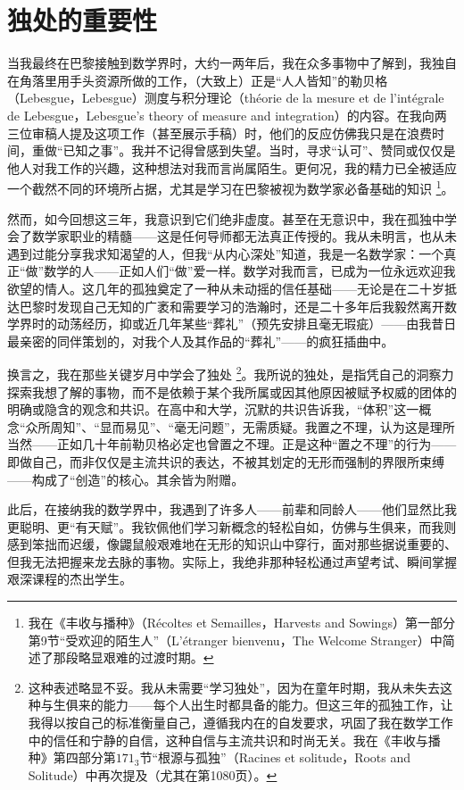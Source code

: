 \section{独处的重要性}

当我最终在巴黎接触到数学界时，大约一两年后，我在众多事物中了解到，我独自在角落里用手头资源所做的工作，（大致上）正是“人人皆知”的勒贝格（Lebesgue，Lebesgue）测度与积分理论（théorie de la mesure et de l'intégrale de Lebesgue，Lebesgue's theory of measure and integration）的内容。在我向两三位审稿人提及这项工作（甚至展示手稿）时，他们的反应仿佛我只是在浪费时间，重做“已知之事”。我并不记得曾感到失望。当时，寻求“认可”、赞同或仅仅是他人对我工作的兴趣，这种想法对我而言尚属陌生。更何况，我的精力已全被适应一个截然不同的环境所占据，尤其是学习在巴黎被视为数学家必备基础的知识 \footnote{我在《丰收与播种》（Récoltes et Semailles，Harvests and Sowings）第一部分第9节“受欢迎的陌生人”（L'étranger bienvenu，The Welcome Stranger）中简述了那段略显艰难的过渡时期。}。

然而，如今回想这三年，我意识到它们绝非虚度。甚至在无意识中，我在孤独中学会了数学家职业的精髓——这是任何导师都无法真正传授的。我从未明言，也从未遇到过能分享我求知渴望的人，但我“从内心深处”知道，我是一名数学家：一个真正“做”数学的人——正如人们“做”爱一样。数学对我而言，已成为一位永远欢迎我欲望的情人。这几年的孤独奠定了一种从未动摇的信任基础——无论是在二十岁抵达巴黎时发现自己无知的广袤和需要学习的浩瀚时，还是二十多年后我毅然离开数学界时的动荡经历，抑或近几年某些“葬礼”（预先安排且毫无瑕疵）——由我昔日最亲密的同伴策划的，对我个人及其作品的“葬礼”——的疯狂插曲中。

换言之，我在那些关键岁月中学会了独处 \footnote{这种表述略显不妥。我从未需要“学习独处”，因为在童年时期，我从未失去这种与生俱来的能力——每个人出生时都具备的能力。但这三年的孤独工作，让我得以按自己的标准衡量自己，遵循我内在的自发要求，巩固了我在数学工作中的信任和宁静的自信，这种自信与主流共识和时尚无关。我在《丰收与播种》第四部分第$171_3$节“根源与孤独”（Racines et solitude，Roots and Solitude）中再次提及（尤其在第1080页）。}。我所说的独处，是指凭自己的洞察力探索我想了解的事物，而不是依赖于某个我所属或因其他原因被赋予权威的团体的明确或隐含的观念和共识。在高中和大学，沉默的共识告诉我，“体积”这一概念“众所周知”、“显而易见”、“毫无问题”，无需质疑。我置之不理，认为这是理所当然——正如几十年前勒贝格必定也曾置之不理。正是这种“置之不理”的行为——即做自己，而非仅仅是主流共识的表达，不被其划定的无形而强制的界限所束缚——构成了“创造”的核心。其余皆为附赠。

此后，在接纳我的数学界中，我遇到了许多人——前辈和同龄人——他们显然比我更聪明、更“有天赋”。我钦佩他们学习新概念的轻松自如，仿佛与生俱来，而我则感到笨拙而迟缓，像鼹鼠般艰难地在无形的知识山中穿行，面对那些据说重要的、但我无法把握来龙去脉的事物。实际上，我绝非那种轻松通过声望考试、瞬间掌握艰深课程的杰出学生。

